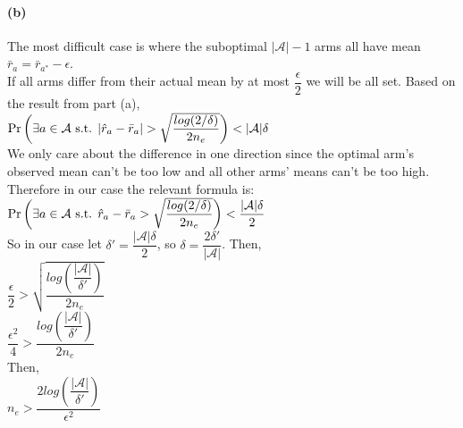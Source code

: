 \documentclass[10pt,a4paper]{article}
\begin{document}
  \paragraph{ (b) }
  The most difficult case is where the suboptimal $|\mathcal{A}|-1$ arms all have mean $\bar{r}_a=\bar{r}_{a^*}-\epsilon$. \\
  If all arms differ from their actual mean by at most $\dfrac{\epsilon}{2}$ we will be all set.
  Based on the result from part (a), \\
  $\Pr\bigg{(}\exists a \in \mathcal{A} \textrm{ s.t. } |\hat{r}_a-\bar{r}_a| > \sqrt{\dfrac{log(2/\delta)}{2n_e}}\bigg{)} < |\mathcal{A}|\delta$ \\
  We only care about the difference in one direction since the optimal arm's observed mean can't be too low and all other arms' means can't be too high.  Therefore in our case the relevant formula is: \\
  $\Pr\bigg{(}\exists a \in \mathcal{A} \textrm{ s.t. } \hat{r}_a-\bar{r}_a > \sqrt{\dfrac{log(2/\delta)}{2n_e}}\bigg{)} < \dfrac{|\mathcal{A}|\delta}{2}$ \\    
  So in our case let $\delta'=\dfrac{|\mathcal{A}|\delta}{2}$, so $\delta=\dfrac{2\delta'}{|\mathcal{A}|}$.  Then, \\
  $\dfrac{\epsilon}{2} > \sqrt{\dfrac{log(\dfrac{|\mathcal{A}|}{\delta'})}{2n_e}}$ \\
  $\dfrac{\epsilon^2}{4} > \dfrac{log(\dfrac{|\mathcal{A}|}{\delta'})}{2n_e}$ \\
  Then, \\
  $n_e > \dfrac{2log(\dfrac{|\mathcal{A}|}{\delta'})}{\epsilon^2}$
  
\end{document}
